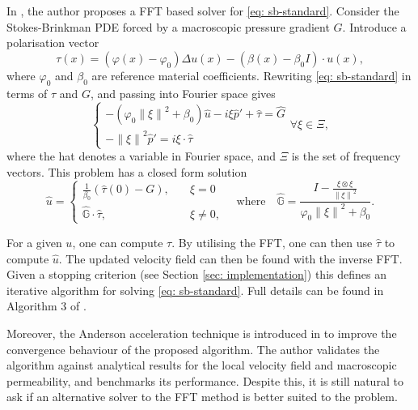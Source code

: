 \documentclass[12pt]{article}
\newcommand\norm[1]{\left\lVert#1\right\rVert}
\renewcommand\brack[1]{\left (#1\right)}
\theoremstyle{theorem}
\begin{document}
In \cite{chen2023}, the author proposes a FFT based solver for \eqref{eq: sb-standard}. Consider the Stokes-Brinkman PDE forced by a macroscopic pressure gradient $G$. Introduce a polarisation vector
\begin{equation}
    \tau(x) = (\varphi(x) - \varphi_0)\Delta u(x) - (\beta(x) - \beta_0 I) \cdot u(x),
\end{equation}
where $\varphi_0$ and $\beta_0$ are reference material coefficients. Rewriting \eqref{eq: sb-standard} in terms of $\tau$ and $G$, and passing into Fourier space gives
\begin{equation}
    \begin{cases}
        -\brack{\varphi_0 \norm{\xi}^2 + \beta_0}\hat u - i\xi \hat p'+ \hat \tau = \hat G \\
        - \norm{\xi}^2\hat p' = i \xi \cdot \hat \tau
    \end{cases}
    \forall \xi \in \Xi,
\end{equation}
where the hat denotes a variable in Fourier space, and $\Xi$ is the set of frequency vectors. This problem has a closed form solution
\begin{equation}
    \hat u = 
    \begin{cases}
        \frac{1}{\beta_0} \brack{\hat \tau(0) - G}, \quad &\xi = 0 \\
        \hat{\mathbb{G}} \cdot \hat \tau, \quad &\xi \neq 0,
    \end{cases}
    \quad
    \text{where}
    \quad
    \hat{\mathbb{G}} = \frac{I - \frac{\xi \otimes \xi}{\norm{\xi}^2}}{\varphi_0\norm{\xi}^2 + \beta_0}.
\end{equation}

For a given $u$, one can compute $\tau$. By utilising the FFT, one can then use $\hat \tau$ to compute $\hat u$. The updated velocity field can then be found with the inverse FFT. Given a stopping criterion (see Section \ref{sec: implementation}) this defines an iterative algorithm for solving \eqref{eq: sb-standard}. Full details can be found in Algorithm 3 of \cite{chen2023}.

Moreover, the Anderson acceleration technique \cite{walker2011anderson} is introduced in \cite{chen2023} to improve the convergence behaviour of the proposed algorithm. The author validates the algorithm against analytical results for the local velocity field and macroscopic permeability, and benchmarks its performance. Despite this, it is still natural to ask if an alternative solver to the FFT method is better suited to the problem.
\end{document}
